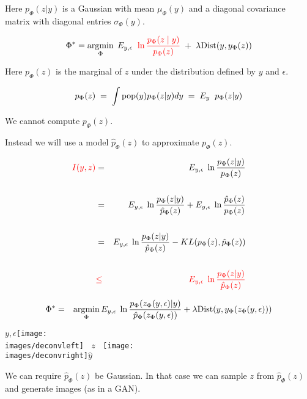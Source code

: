 {\vfill
\vfill
Here $p_\Phi(z|y)$ is a Gaussian with mean $\mu_\Phi(y)$ and a diagonal covariance matrix with diagonal entries $\sigma_\Phi(y)$.


$$\Phi^* = \operatorname*{argmin}_\Phi\; E_{y,\epsilon} \;\; {\color{red} \ln \frac{p_\Phi(z\; |\; y)}{p_\Phi(z)}}\; +\;\lambda\mathrm{Dist}(y,y_\Phi(z))$$

\vfill
Here $p_\Phi(z)$ is the marginal of $z$ under the distribution defined by $y$ and $\epsilon$.

\vfill
$$p_{\Phi}(z) \; = \; \int \mathrm{pop}(y)p_\Phi(z|y)dy \;=\;  E_{y}\;\;p_\Phi(z|y)$$

\vfill
We cannot compute $p_{\Phi}(z)$.

\vfill
Instead we will use a model $\hat{p}_\Phi(z)$ to approximate $p_{\Phi}(z)$.


\begin{eqnarray*}
{\color{red} I(y,z)}  & = & E_{y,\epsilon}\;\ln \frac{p_\Phi(z|y)}{p_{\Phi}(z)} \\
\\
& = & E_{y,\epsilon}\;\ln \frac{p_\Phi(z|y)}{\hat{p}_\Phi(z)} + E_{y,\epsilon}\;\ln\frac{\hat{p}_\Phi(z)}{p_{\Phi}(z)} \\
\\
& = & E_{y,\epsilon}\;\ln \frac{p_\Phi(z|y)}{\hat{p}_\Phi(z)} - KL(p_{\Phi}(z),\hat{p}_\Phi(z)) \\
\\
& {\color{red} \leq} & {\color{red} E_{y,\epsilon}\;\ln \frac{p_\Phi(z|y)}{\hat{p}_\Phi(z)}}
\end{eqnarray*}


{\huge
\begin{eqnarray*}
\Phi^* & = & \operatorname*{argmin}_\Phi E_{y,\epsilon}\;\ln \frac{p_\Phi(z_\Phi(y,\epsilon)|y)}{\hat{p}_\Phi(z_\Phi(y,\epsilon))}
+ \lambda \mathrm{Dist}(y,y_\Phi(z_\Phi(y,\epsilon)))
\end{eqnarray*}

\vfill
\centerline{$y,\epsilon$\texttt{[image: \\images/deconvleft]} $\;\;z\;\;$ \texttt{[image: \\images/deconvright]}$\hat{y}$}



We can require $\hat{p}_\Phi(z)$ be Gaussian.  In that case we can sample $z$ from $\hat{p}_\Phi(z)$ and generate images (as in a GAN).

}}
